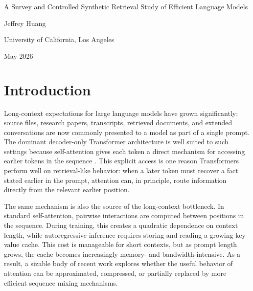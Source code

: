 \documentclass[10pt]{article}
\begin{document}
\begin{center}
{\Large A Survey and Controlled Synthetic Retrieval Study of Efficient Language Models\par}
\vspace{0.35em}
{\normalsize Jeffrey Huang\par}
\vspace{0.05em}
{\small University of California, Los Angeles\par}
\vspace{0.05em}
{\small May 2026\par}
\end{center}
\vspace{0.7em}

\section{Introduction}
Long-context expectations for large language models have grown significantly: source files,
research papers, transcripts, retrieved documents, and extended conversations
are now commonly presented to a model as part of a single prompt. The dominant
decoder-only Transformer architecture is well suited to such settings because
self-attention gives each token a direct mechanism for accessing earlier tokens
in the sequence \cite{vaswani2017attention}. This explicit access is one reason
Transformers perform well on retrieval-like behavior: when a later token must
recover a fact stated earlier in the prompt, attention can, in principle, route
information directly from the relevant earlier position.

The same mechanism is also the source of the long-context bottleneck. In
standard self-attention, pairwise interactions are computed between positions in
the sequence. During training, this creates a quadratic dependence on context
length, while autoregressive inference requires storing and reading a growing
key-value cache. This cost is manageable for short contexts, but as prompt length grows,
the cache becomes increasingly memory- and bandwidth-intensive. As a result, a
sizable body of recent work explores whether the useful behavior of attention can be
approximated, compressed, or partially replaced by more efficient sequence
mixing mechanisms.
\end{document}

